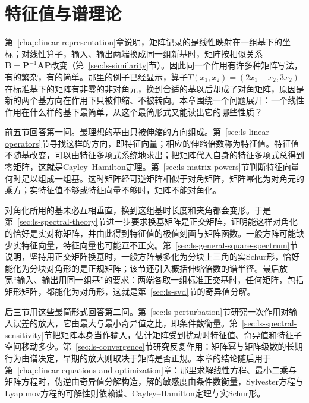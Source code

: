 \chapter{特征值与谱理论}
\label{chap:linear-analysis}
\label{chap:matrix-analysis}

第~\ref{chap:linear-representation}章说明，矩阵记录的是线性映射在一组基下的坐标；对线性算子，输入、输出两端换成同一组新基时，矩阵按相似关系$\bm B=\bm P^{-1}\bm A\bm P$改变（第~\ref{sec:ls-similarity}节）。因此同一个作用有许多种矩阵写法，有的繁杂，有的简单。那里的例子已经显示，算子$T(x_1,x_2)=(2x_1+x_2,3x_2)$在标准基下的矩阵有非零的非对角元，换到合适的基以后却成了对角矩阵，原因是新的两个基方向在作用下只被伸缩、不被转向。本章围绕一个问题展开：一个线性作用在什么样的基下最简单，从这个最简形式又能读出它的哪些性质？

前五节回答第一问。最理想的基由只被伸缩的方向组成。第~\ref{sec:ls-linear-operators}节寻找这样的方向，即特征向量；相应的伸缩倍数称为特征值。特征值不随基改变，可以由特征多项式系统地求出；把矩阵代入自身的特征多项式总得到零矩阵，这就是Cayley--Hamilton定理。第~\ref{sec:ls-matrix-powers}节判断特征向量何时足以组成一组基。这时矩阵经可逆矩阵相似于对角矩阵，矩阵幂化为对角元的乘方；实特征值不够或特征向量不够时，矩阵不能对角化。

对角化所用的基未必互相垂直，换到这组基时长度和夹角都会变形。于是第~\ref{sec:ls-spectral-theory}节进一步要求换基矩阵是正交矩阵，证明能这样对角化的恰好是实对称矩阵，并由此得到特征值的极值刻画与矩阵函数。一般方阵可能缺少实特征向量，特征向量也可能互不正交。第~\ref{sec:ls-general-square-spectrum}节说明，坚持用正交矩阵换基时，一般方阵最多化为分块上三角的实Schur形，恰好能化为分块对角形的是正规矩阵；该节还引入概括伸缩倍数的谱半径。最后放宽“输入、输出用同一组基”的要求：两端各取一组标准正交基时，任何矩阵，包括矩形矩阵，都能化为对角形，这就是第~\ref{sec:ls-svd}节的奇异值分解。

后三节用这些最简形式回答第二问。第~\ref{sec:ls-perturbation}节研究一次作用对输入误差的放大，它由最大与最小奇异值之比，即条件数衡量。第~\ref{sec:ls-spectral-sensitivity}节把矩阵本身当作输入，估计矩阵受到扰动时特征值、奇异值和特征子空间移动多少。第~\ref{sec:ls-convergence}节研究反复作用：矩阵幂与矩阵级数的长期行为由谱决定，早期的放大则取决于矩阵是否正规。本章的结论随后用于第~\ref{chap:linear-equations-and-optimization}章：那里求解线性方程、最小二乘与矩阵方程时，伪逆由奇异值分解构造，解的敏感度由条件数衡量，Sylvester方程与Lyapunov方程的可解性则依赖谱、Cayley--Hamilton定理与实Schur形。

